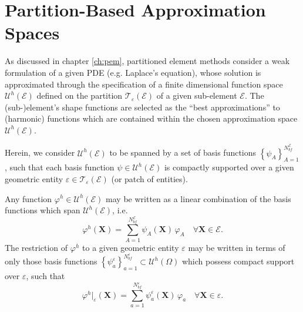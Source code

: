 \section{Partition-Based Approximation Spaces}

		As discussed in chapter \ref{ch:pem}, partitioned element methods consider a weak formulation of a given PDE (e.g. Laplace's equation), whose solution is approximated through the specification of a finite dimensional function space $\mathcal{U}^h (\mathcal{E})$ defined on the partition $\mathcal{T}_{\varepsilon} (\mathcal{E})$ of a given sub-element $\mathcal{E}$. The (sub-)element's shape functions are selected as the ``best approximations'' to (harmonic) functions which are contained within the chosen approximation space $\mathcal{U}^h (\mathcal{E})$.
		
		Herein, we consider $\mathcal{U}^h (\mathcal{E})$ to be spanned by a set of basis functions $\left\{ \psi_A \right\}_{A=1}^{N^{\mathcal{E}}_{bf}}$, such that each basis function $\psi \in \mathcal{U}^h (\mathcal{E})$ is compactly supported over a given geometric entity $\varepsilon \in \mathcal{T}_\varepsilon (\mathcal{E})$ (or patch of entities).
		
		Any function $\varphi^h \in \mathcal{U}^h (\mathcal{E})$ may be written as a linear combination of the basis functions which span $\mathcal{U}^h (\mathcal{E})$, i.e.
		\begin{equation}
			\varphi^h (\mathbf{X}) = \sum_{A=1}^{N^{\mathcal{E}}_{bf}} \psi_A (\mathbf{X}) \, \varphi_A \quad \forall \mathbf{X} \in \mathcal{E}.
		\end{equation}
		The restriction of $\varphi^h$ to a given geometric entity $\varepsilon$ may be written in terms of only those basis functions $\left\{ \psi^\varepsilon_{a} \right\}_{a=1}^{N^\varepsilon_{bf}} \subset \mathcal{U}^h (\Omega)$ which possess compact support over $\varepsilon$, such that
		\begin{equation}
			\varphi^h|_\varepsilon (\mathbf{X}) = \sum_{a=1}^{N^\varepsilon_{bf}} \psi^\varepsilon_{a} (\mathbf{X}) \, \varphi_{a} \quad \forall \mathbf{X} \in \varepsilon.
		\end{equation}
		
